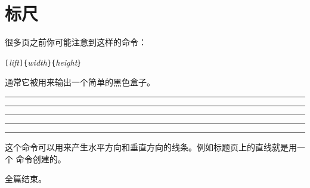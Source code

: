\section{标尺}
\label{sec:rule}

很多页之前你可能注意到这样的命令：
\begin{lscommand}
\verb|[|\emph{lift}\verb|]{|\emph{width}\verb|}{|\emph{height}\verb|}|
\end{lscommand}

\noindent 通常它被用来输出一个简单的黑色盒子。

\begin{example}
\rule{3mm}{.1pt}%
\rule[-1mm]{5mm}{1cm}%
\rule{3mm}{.1pt}%
\rule[1mm]{1cm}{5mm}%
\rule{3mm}{.1pt}
\end{example}

\noindent 这个命令可以用来产生水平方向和垂直方向的线条。例如标题页上的直线就是用一个  命令创建的。

\bigskip
{\flushright 全篇结束。\par}
%

